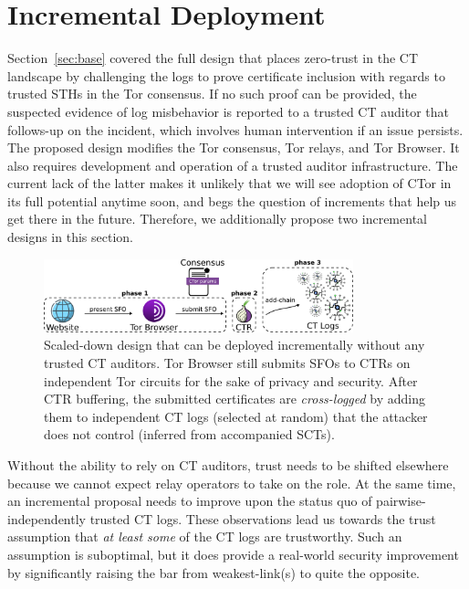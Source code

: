 \section{Incremental Deployment} \label{sec:incremental} 

Section~\ref{sec:base} covered the full design that places zero-trust in the CT
landscape by challenging the logs to prove certificate inclusion with regards to
trusted STHs in the Tor consensus.  If no such proof can be provided, the
suspected evidence of log misbehavior is reported to a trusted CT auditor that
follows-up on the incident, which involves human intervention if an issue
persists.  The proposed design modifies the Tor consensus, Tor relays, and Tor
Browser.  It also requires development and operation of a trusted auditor
infrastructure.  The current lack of the latter makes it unlikely that we will
see adoption of CTor in its full potential anytime soon, and begs the question
of increments that help us get there in the future. Therefore, we additionally
propose two incremental designs in this section.

\begin{figure}
    \centering
	\includegraphics[width=0.8\textwidth]{img/design-ca}
	\vspace{-8px}
	\caption{%
		Scaled-down design that can be deployed incrementally without any
		trusted CT auditors.  Tor Browser still submits SFOs to CTRs on
		independent Tor circuits for the sake of privacy and security.  After
		CTR buffering, the submitted certificates are \emph{cross-logged} by
		adding them to independent CT logs (selected at random) that the
		attacker does not control (inferred from accompanied SCTs).
	}
	\label{fig:cross-log}
	\vspace{-10px}
\end{figure}

Without the ability to rely on CT auditors, trust needs to be shifted elsewhere
because we cannot expect relay operators to take on the role.  At the same time,
an incremental proposal needs to improve upon the status quo of
pairwise-independently trusted CT logs. These observations lead us towards the
trust assumption that \emph{at least some} of the CT logs are trustworthy. Such
an assumption is suboptimal, but it does provide a real-world security
improvement by significantly raising the bar from weakest-link(s) to quite the
opposite.

